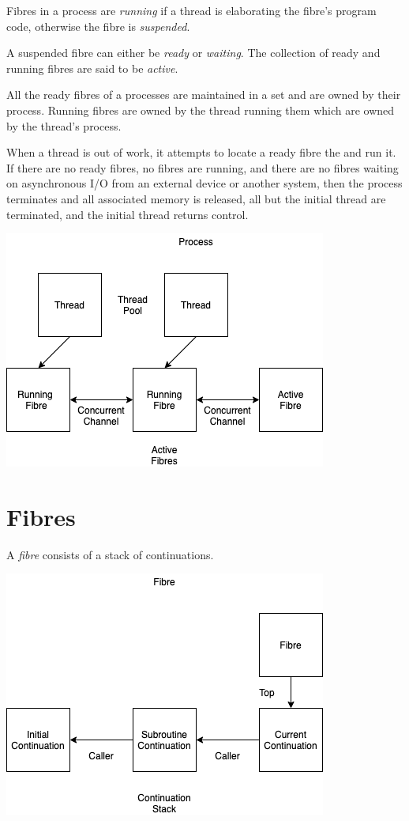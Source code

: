 \documentclass[oneside]{book}
\begin{document}
Fibres in a process are {\em running} if a thread is elaborating the
fibre's program code, otherwise the fibre is {\em suspended}. 

A suspended fibre can either be {\em ready} or {\em waiting}.
The collection of ready and running fibres are said to be {\em active}.

All the ready fibres of a processes are maintained in a set and
are owned by their process. Running fibres are owned by the thread
running them which are owned by the thread's process.

When a thread is out of work, it attempts to locate a 
ready fibre the and run it. If there are no ready fibres,
no fibres are running, and there are no fibres waiting on
asynchronous I/O from an external device or another system,
then the process terminates and all associated memory is released,
all but the initial thread are terminated, and the initial thread
returns control.

\includegraphics{../src/tex/process.png}


\section{Fibres}

A {\em fibre} consists of a stack of continuations.

\includegraphics{../src/tex/fibre.png}
\end{document}
